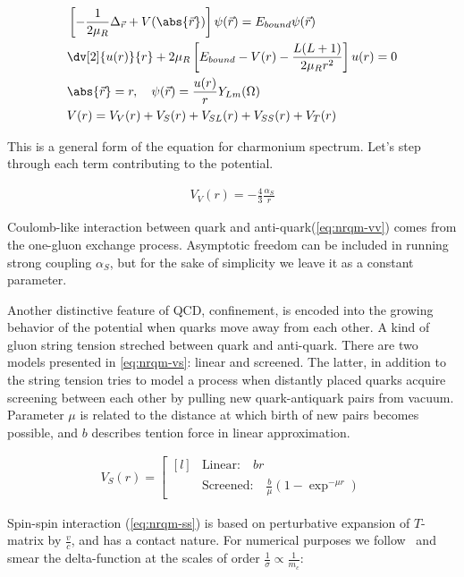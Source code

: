 \begin{align}
    &\left[ -\frac{1}{2 \mu_R} \Delta_{\vec{r}} + V(\abs{\vec{r}}) \right] \psi(\vec{r}) = E_{bound} \psi(\vec{r}) \\
    &\dv[2]{u(r)}{r} + 2 \mu_R \left[ E_{bound} - V(r) - \frac{L(L+1)}{2 \mu_R r^2} \right] u(r) = 0 \label{eq:nrqm-radialeq} \\
    &\abs{\vec{r}} = r ,\quad \psi(\vec{r}) = \frac{u(r)}{r} Y_{Lm}(\Omega) \\
    &V(r) = V_V(r) +V_S(r) + V_{SL}(r) + V_{SS}(r) + V_T(r)
\end{align}

This is a general form of the equation for charmonium spectrum. Let's step through each term contributing to the potential.

\begin{align} \label{eq:nrqm-vv}
    V_V(r) = -\frac{4}{3} \frac{\alpha_S}{r}
\end{align}

Coulomb-like interaction between quark and anti-quark(\cref{eq:nrqm-vv}) comes from the one-gluon exchange process. Asymptotic freedom can be included in running strong coupling $\alpha_S$, but for the sake of simplicity we leave it as a constant parameter.

Another distinctive feature of QCD, confinement, is encoded into the growing behavior of the potential when quarks move away from each other. A kind of gluon string tension streched between quark and anti-quark. There are two models presented in \cref{eq:nrqm-vs}: linear and screened. The latter, in addition to the string tension tries to model a process when distantly placed quarks acquire screening between each other by pulling new quark-antiquark pairs from vacuum. Parameter $\mu$ is related to the distance at which birth of new pairs becomes possible, and $b$ describes tention force in linear approximation.

\begin{align} \label{eq:nrqm-vs}
    V_S(r) = \left[ \begin{matrix*}[l]
                    &\text{Linear:}\quad br \\
                    &\text{Screened:}\quad \frac{b}{\mu} (1 - \exp^{-\mu r})
              \end{matrix*} \right.
\end{align}

Spin-spin interaction (\cref{eq:nrqm-ss}) is based on perturbative expansion of $T$-matrix by $\frac{v}{c}$, and has a contact nature. For numerical purposes we follow~\cite{gbs-model} and smear the delta-function at the scales of order $\frac{1}{\sigma} \propto \frac{1}{m_c}$:

